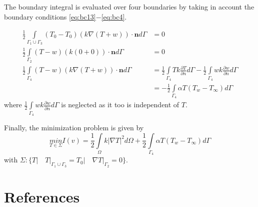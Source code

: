 \documentclass[10pt,a4paper]{article}
\begin{document}
The boundary integral is evaluated over four boundaries by taking in account the boundary conditions \eqref{eq:bc13}$-$\eqref{eq:bc4}. 

\begin{align}\label{eq:bcint13}
	\frac{1}{2}\underset{\Gamma_1\cup\Gamma_3}{\int}(T_0-T_0)(k\nabla(T+w))\cdot\textbf{\^{n}} d\Gamma &= 0\\
	\frac{1}{2}\underset{\Gamma_2}{\int}(T-w)(k(0+0))\cdot\textbf{\^{n}} d\Gamma & = 0\label{eq:bcint2}\\ 
	\frac{1}{2}\underset{\Gamma_4}{\int}(T-w)(k\nabla(T+w))\cdot\textbf{\^{n}} d\Gamma & = \frac{1}{2}\underset{\Gamma_4}{\int}Tk\frac{\partial T}{\partial n}d\Gamma - \frac{1}{2}\underset{\Gamma_4}{\int}wk\frac{\partial w}{\partial n}d\Gamma\nonumber\\
	&=-\frac{1}{2}\underset{\Gamma_4}{\int}\alpha T(T_w-T_{\infty})d\Gamma \label{eq:bcint4}
\end{align}
where $\frac{1}{2}\underset{\Gamma_4}{\int}wk\frac{\partial w}{\partial n}d\Gamma$ is neglected as it too is independent of $T$.

Finally, the minimization problem is given by
\begin{equation}\label{eq:minf}
\underset{T\in\Sigma} {min}I(v) =\frac{1}{2}\underset{\Omega}{\int}k\lvert\nabla T \rvert ^{2}  d\Omega + \frac{1}{2}\underset{\Gamma_4}{\int}\alpha T(T_w-T_{\infty})d\Gamma 
\end{equation}
with $\Sigma: \{T\rvert\quad T\rvert_{\Gamma_1\cup\Gamma_3}=T_0\rvert\quad \nabla T\rvert_{\Gamma_2}=0\}$.
\section{References}
\end{document}
